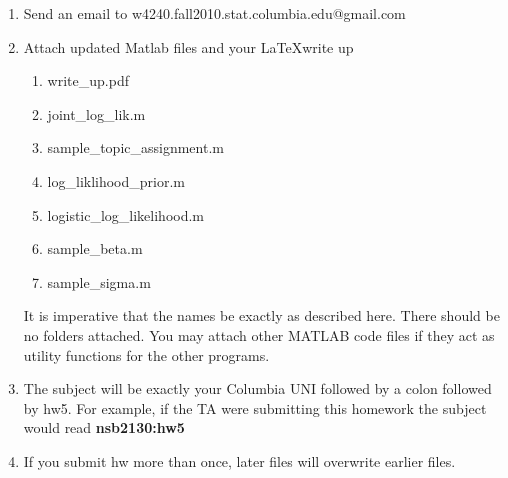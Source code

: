 \documentclass[12pt]{article}
\begin{document}
\begin{enumerate}
	\item Send an email to w4240.fall2010.stat.columbia.edu@gmail.com
	\item {Attach updated Matlab files and your \LaTeX write up 
		\begin{enumerate}
			\item write\_up.pdf
			\item joint\_log\_lik.m
			\item sample\_topic\_assignment.m
			\item log\_liklihood\_prior.m
			\item logistic\_log\_likelihood.m
			\item sample\_beta.m
			\item sample\_sigma.m
		\end{enumerate} It is imperative that the names be exactly as described here. There should be no folders attached.  You may attach other MATLAB code files if they act as utility functions for the other programs. }
	\item The subject will be exactly your Columbia UNI followed by a colon followed by hw5.  For example, if the TA were submitting this homework the subject would read {\bf nsb2130:hw5}
	\item If you submit hw more than once, later files will overwrite earlier files.
\end{enumerate}


\problemsdone
\end{document}
